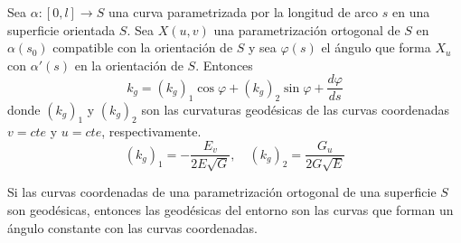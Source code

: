 \begin{theorem}
    Sea $\alpha : [0, l] \to S$ una curva parametrizada por la longitud de arco $s$ en una superficie orientada $S$.
    Sea $X(u, v)$ una parametrización ortogonal de $S$ en $\alpha(s_0)$ compatible con la orientación de $S$ y sea $\varphi(s)$ el ángulo que forma $X_u$ con $\alpha'(s)$ en la orientación de $S$. Entonces
    $$k_g = {(k_g)}_1\cos\varphi + {(k_g)}_2\sin\varphi + \frac{d\varphi}{ds}$$
    donde ${(k_g)}_1$ y ${(k_g)}_2$ son las curvaturas geodésicas de las curvas coordenadas $v = cte$ y $u = cte$, respectivamente.
    $${(k_g)}_1 = -\frac{E_v}{2E\sqrt{G}}, \quad {(k_g)}_2 = \frac{G_u}{2G\sqrt{E}}$$
\end{theorem}

\begin{corollary}
    Si las curvas coordenadas de una parametrización ortogonal de una superficie $S$ son geodésicas, entonces las geodésicas del entorno son las curvas que forman un ángulo constante con las curvas coordenadas.
\end{corollary}